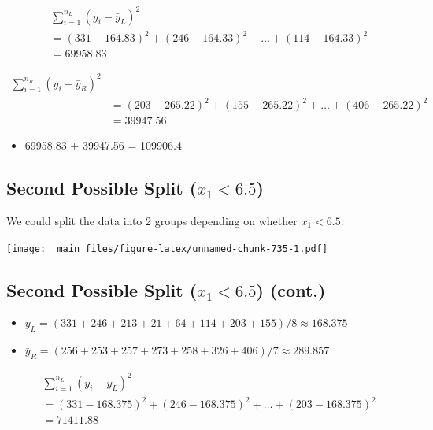 \documentclass[]{book}
\providecommand{\tightlist}{%
  \setlength{\itemsep}{0pt}\setlength{\parskip}{0pt}}
\begin{document}
\[
\begin{aligned}
& \displaystyle\sum_{i=1}^{n_L} (y_i -\bar{y}_L)^2  \\
& =(331-164.83)^2+(246-164.33)^2 + \ldots+(114-164.33)^2 \\
& =69958.83
\end{aligned}
\]

\[
\begin{aligned}
\displaystyle\sum_{i=1}^{n_R} (y_i -\bar{y}_R)^2 \\
& =(203-265.22)^2+(155-265.22)^2 + \ldots+(406-265.22)^2 \\
& =39947.56
\end{aligned}
\]

\begin{itemize}
\tightlist
\item
  69958.83 + 39947.56 = 109906.4
\end{itemize}

\subsection{\texorpdfstring{Second Possible Split
(\(x_1 < 6.5\))}{Second Possible Split (x\_1 \textless{} 6.5)}}\label{second-possible-split-x_1-6.5}

We could split the data into 2 groups depending on whether
\(x_1 < 6.5\).

\texttt{[image: \_main\_files/figure-latex/unnamed-chunk-735-1.pdf]}

\subsection{\texorpdfstring{Second Possible Split (\(x_1 < 6.5\))
(cont.)}{Second Possible Split (x\_1 \textless{} 6.5) (cont.)}}\label{second-possible-split-x_1-6.5-cont.}

\begin{itemize}
\tightlist
\item
  \(\bar{y}_L = (331+246+213+21+64+114 + 203+155)/8 \approx 168.375\)\\
\item
  \(\bar{y}_R = (256+253+257+273+258+326+406)/7 \approx 289.857\)
\end{itemize}

\[
\begin{aligned}
& \displaystyle\sum_{i=1}^{n_L} (y_i -\bar{y}_L)^2  \\
& =(331-168.375)^2+(246-168.375)^2 + \ldots+(203-168.375)^2 \\
& =71411.88
\end{aligned}
\]
\end{document}
